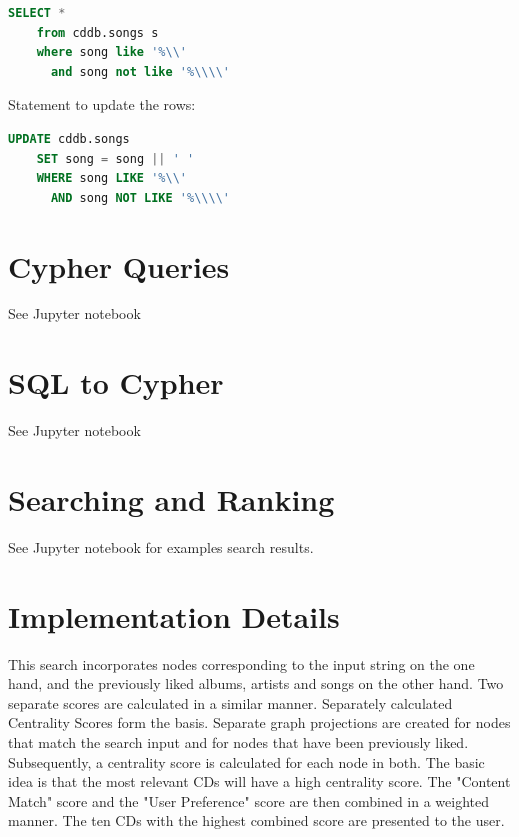 \documentclass{article}
\begin{document}
\begin{lstlisting}[language=sql]
    SELECT * 
    from cddb.songs s 
    where song like '%\\' 
      and song not like '%\\\\'
\end{lstlisting}

Statement to update the rows:

\begin{lstlisting}[language=sql]
    UPDATE cddb.songs 
    SET song = song || ' ' 
    WHERE song LIKE '%\\' 
      AND song NOT LIKE '%\\\\'
\end{lstlisting}



\section{Cypher Queries}

See Jupyter notebook 

\section{SQL to Cypher}

See Jupyter notebook 

\section{Searching and Ranking}

See Jupyter notebook  for examples search results.

\section{Implementation Details}

This search incorporates nodes corresponding to the input string on the one hand, and the previously liked albums, artists and songs on the other hand. Two separate scores are calculated in a similar manner. Separately calculated Centrality Scores form the basis. Separate graph projections are created for nodes that match the search input and for nodes that have been previously liked. Subsequently, a centrality score is calculated for each node in both. The basic idea is that the most relevant CDs will have a high centrality score. The "Content Match" score and the "User Preference" score are then combined in a weighted manner. The ten CDs with the highest combined score are presented to the user.
\end{document}
